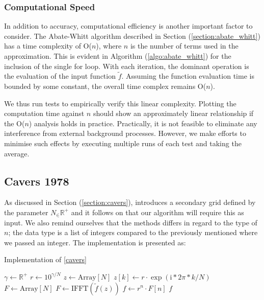 \documentclass[a4paper]{report}
\begin{document}
\subsubsection{Computational Speed}\label{section:aw_speed}
In addition to accuracy, computational efficiency is another important factor to consider. The Abate-Whitt algorithm described in Section (\ref{section:abate_whitt}) has a time complexity of O($n$), where $n$ is the number of terms used in the approximation. This is evident in Algorithm (\ref{algo:abate_whitt}) for the inclusion of the single for loop. With each iteration, the dominant operation is the evaluation of the input function $\tilde{f}$. Assuming the function evaluation time is bounded by some constant, the overall time complex remains O($n$). 

We thus run tests to empirically verify this linear complexity. Plotting the computation time against $n$ should show an approximately linear relationship if the O($n$) analysis holds in practice. Practically, it is not feasible to eliminate any interference from external background processes. However, we make efforts to minimise such effects by executing multiple runs of each test and taking the average.

\subsection{Cavers 1978}
As discussed in Section (\ref{section:cavers}), \citet{Cavers1978FFT} introduces a secondary grid defined by the parameter $N_\in \mathbb{R}^+$ and it follows on that our algorithm will require this as input. We also remind ourselves that the methods differs in regard to the type of $n$; the data type is a list of integers compared to the previously mentioned where we passed an integer. The implementation is presented as:

\begin{algorithm}[H]
    \caption{Implementation of \autoref{cavers}}
    \label{algo:cavers}
    \begin{algorithmic}[1]
        	\State $\gamma \gets \mathbb{R}^+$
            \State $r \gets 10^{\gamma / N}$
            \State $z \gets \text{Array}[N]$
                \State $z[k] \gets r \cdot \exp(\text{i} * 2 \pi * k / N)$
            \EndFor
            \State $F \gets \text{Array}[N]$
            \State $F \gets \text{IFFT}(\tilde{f}(z))$
            \State $f \gets r^n \cdot F[n]$
            \State \Return $f$ 
        \EndProcedure
    \end{algorithmic}
\end{algorithm}
\end{document}
